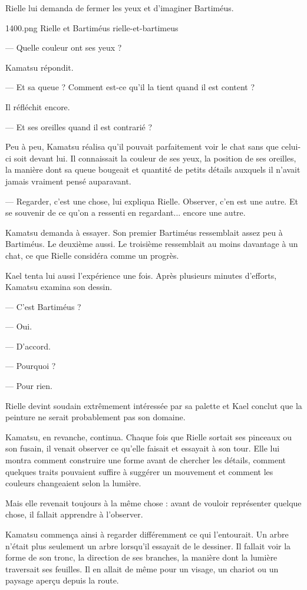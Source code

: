 Rielle lui demanda de fermer les yeux et d'imaginer Bartiméus.

\illustration
  {1400.png}
  {Rielle et Bartiméus}
  {rielle-et-bartimeus}

— Quelle couleur ont ses yeux ?

Kamatsu répondit.

— Et sa queue ? Comment est-ce qu'il la tient quand il est content ?

Il réfléchit encore.

— Et ses oreilles quand il est contrarié ?

Peu à peu, Kamatsu réalisa qu'il pouvait parfaitement voir le chat sans que
celui-ci soit devant lui. Il connaissait la couleur de ses yeux, la position
de ses oreilles, la manière dont sa queue bougeait et quantité de petits
détails auxquels il n'avait jamais vraiment pensé auparavant.

— Regarder, c'est une chose, lui expliqua Rielle. Observer, c'en est une autre.
Et se souvenir de ce qu'on a ressenti en regardant... encore une autre.

Kamatsu demanda à essayer. Son premier Bartiméus ressemblait assez peu à
Bartiméus. Le deuxième aussi. Le troisième ressemblait au moins davantage à un
chat, ce que Rielle considéra comme un progrès.

Kael tenta lui aussi l'expérience une fois. Après plusieurs minutes d'efforts,
Kamatsu examina son dessin.

— C'est Bartiméus ?

— Oui.

— D'accord.

— Pourquoi ?

— Pour rien.

Rielle devint soudain extrêmement intéressée par sa palette et Kael conclut que
la peinture ne serait probablement pas son domaine.

\scenebreak

Kamatsu, en revanche, continua. Chaque fois que Rielle sortait ses pinceaux ou
son fusain, il venait observer ce qu'elle faisait et essayait à son tour. Elle
lui montra comment construire une forme avant de chercher les détails, comment
quelques traits pouvaient suffire à suggérer un mouvement et comment les
couleurs changeaient selon la lumière.

Mais elle revenait toujours à la même chose : avant de vouloir représenter
quelque chose, il fallait apprendre à l'observer.

Kamatsu commença ainsi à regarder différemment ce qui l'entourait. Un arbre
n'était plus seulement un arbre lorsqu'il essayait de le dessiner. Il fallait
voir la forme de son tronc, la direction de ses branches, la manière dont la
lumière traversait ses feuilles. Il en allait de même pour un visage, un
chariot ou un paysage aperçu depuis la route.


